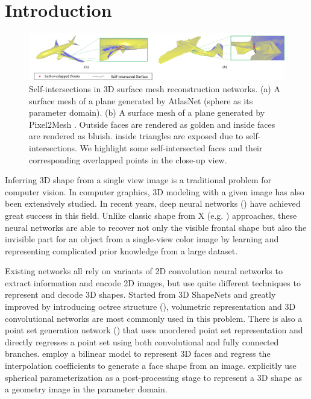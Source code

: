 \section{Introduction}
\begin{figure}[htbp]
	\centering
	\includegraphics[width=\linewidth]{img/issue/issue}
	\caption{Self-intersections in 3D surface mesh reconstruction networks. (a) A surface mesh of a plane generated by AtlasNet \cite{atlasnet} (sphere as its parameter domain). (b) A surface mesh of a plane generated by Pixel2Mesh \cite{pixel2mesh}. Outside faces are rendered as golden and inside faces are rendered as bluish.  inside triangles are exposed due to self-intersections. We highlight some self-intersected faces and their corresponding overlapped points in the close-up view.}
	\label{fig:issue}
\end{figure}
Inferring 3D shape from a single view image is a traditional problem for computer vision. In computer graphics, 3D modeling with a given image has also been extensively studied. In recent years, deep neural networks (\cite{3DR2N2,PSGN,3Drender,imgrecon15,3dshapenet,endface,octreegen,surfnet,shapeprior}) have achieved great success in this field. Unlike classic shape from X (e.g. \cite{shapefromshading,shapefromtext1,shapefromtext2}) approaches, these neural networks are able to recover not only the visible frontal shape but also the invisible part for an object from a single-view color image by learning and representing complicated prior knowledge from a large dataset. 

Existing networks all rely on variants of 2D convolution neural networks to extract information and encode 2D images, but use quite different techniques to represent and decode 3D shapes. Started from 3D ShapeNets \cite{3dshapenet} and greatly improved by introducing octree structure (\cite{octreegen}), volumetric representation and 3D convolutional networks are most commonly used in this problem. There is also a point set generation network (\cite{PSGN}) that uses unordered point set representation and directly regresses a point set using both convolutional and fully connected branches. \cite{endface} employ a bilinear model to represent 3D faces and regress the interpolation coefficients to generate a face shape from an image. \cite{surfnet} explicitly use spherical parameterization as a post-processing stage to represent a 3D shape as a geometry image in the parameter domain. 

